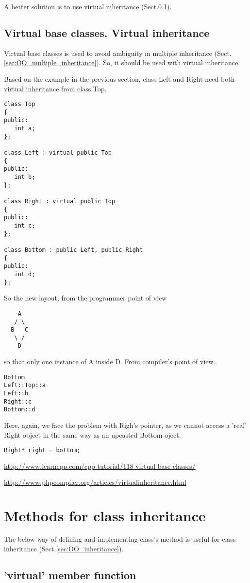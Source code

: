 A better solution is to use virtual inheritance
(Sect.\ref{sec:OO_virtual-inheritance}).

\subsection{Virtual base classes. Virtual inheritance}
\label{sec:OO_virtual-inheritance}

Virtual base classes is used to avoid ambiguity in multiple inheritance
(Sect.\ref{sec:OO_multiple_inheritance}). So, it should be used with virtual
inheritance.

Based on the example in the previous section, class Left and Right need both
virtual inheritance from class Top.
\begin{verbatim}
class Top
{
public:
   int a;
};

class Left : virtual public Top
{
public:
   int b;
};

class Right : virtual public Top
{
public:
   int c;
};

class Bottom : public Left, public Right
{
public:
   int d;
};
\end{verbatim}
So the new layout, from the programmer point of view
\begin{verbatim}
    A
   / \
  B   C
   \ /
    D
\end{verbatim}
so that only one instance of A inside D. From compiler's point of view.
\begin{verbatim}
Bottom
Left::Top::a
Left::b
Right::c
Bottom::d
\end{verbatim}
Here, again, we face the problem with Righ's pointer, as we cannot access a
'real' Right object in the same way as an upcasted Bottom oject.
\begin{verbatim}
Right* right = bottom;
\end{verbatim}


\url{http://www.learncpp.com/cpp-tutorial/118-virtual-base-classes/}

\url{http://www.phpcompiler.org/articles/virtualinheritance.html}



\section{Methods for class inheritance}

The below way of defining and implementing class's method is useful for class
inheritance (Sect.\ref{sec:OO_inheritance}).

\subsection{'virtual' member function}
\label{sec:virtual_member-function}

